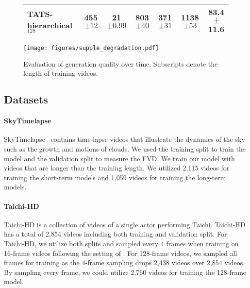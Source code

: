 \documentclass[10pt,twocolumn,letterpaper]{article}
\begin{document}
\begin{figure*}[!t]
\begin{minipage}{\textwidth}
\begin{adjustbox}{width=0.8\textwidth}
\begin{tabular}{lcccccc}
        \\[-1em]TATS-hierarchical$_{128}$ & 455\tiny{$\pm12$} & 21\tiny{$\pm0.99$} & 803\tiny{$\pm40$} & 371\tiny{$\pm31$} & 1138\tiny{$\pm53$} & 83.4\tiny{$\pm$11.6}\\
        \bottomrule
        \end{tabular}
    \end{adjustbox}
    \end{minipage}
    \vspace{0.1cm}
    \begin{minipage}{\textwidth}
        \centering
        \texttt{[image: figures/supple\_degradation.pdf]}
        \caption{Evaluation of generation quality over time. Subscripts denote the length of training videos.}
        \label{fig:supp_degradation}
    \end{minipage}
\vspace{-0.3cm}
\end{figure*}
\fi

\subsection{Datasets}
\label{appx:datasets}
\paragraph{SkyTimelapse} SkyTimelapse~\cite{stl} contains time-lapse videos that illustrate the dynamics of the sky such as the growth and motions of clouds. We used the training split to train the model and the validation split to measure the FVD. We train our model with videos that are longer than the training length. We utilized 2,115 videos for training the short-term models and 1,059 videos for training the long-term models.

\paragraph{Taichi-HD} Taichi-HD is a collection of videos of a single actor performing Taichi. Taichi-HD has a total of 2,854 videos including both training and validation split. For Taichi-HD, we utilize both splits and sampled every 4 frames when training on 16-frame videos following the setting of \cite{TATS, DIGAN}. For 128-frame videos, we sampled all frames for training as the 4-frame sampling drops 2,438 videos over 2,854 videos. By sampling every frame, we could utilize 2,760 videos for training the 128-frame model.
\end{document}
